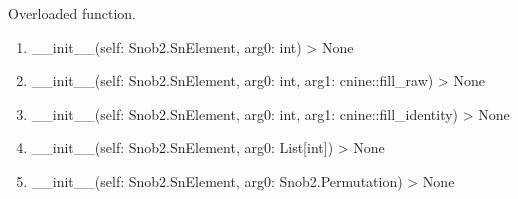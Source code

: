 \documentclass[letterpaper,10pt,english]{sphinxmanual}
\begin{document}
\begin{fulllineitems}

\begin{fulllineitems}
\label{\detokenize{index:Snob2.SnElement.__init__}}
\sphinxAtStartPar
Overloaded function.
\begin{enumerate}
%
\item {} 
\sphinxAtStartPar
\_\_init\_\_(self: Snob2.SnElement, arg0: int) \sphinxhyphen{}\textgreater{} None

\item {} 
\sphinxAtStartPar
\_\_init\_\_(self: Snob2.SnElement, arg0: int, arg1: cnine::fill\_raw) \sphinxhyphen{}\textgreater{} None

\item {} 
\sphinxAtStartPar
\_\_init\_\_(self: Snob2.SnElement, arg0: int, arg1: cnine::fill\_identity) \sphinxhyphen{}\textgreater{} None

\item {} 
\sphinxAtStartPar
\_\_init\_\_(self: Snob2.SnElement, arg0: List{[}int{]}) \sphinxhyphen{}\textgreater{} None

\item {} 
\sphinxAtStartPar
\_\_init\_\_(self: Snob2.SnElement, arg0: Snob2.Permutation) \sphinxhyphen{}\textgreater{} None

\end{enumerate}

\end{fulllineitems}


\begin{fulllineitems}
\label{\detokenize{index:Snob2.SnElement.__inv__}}
\end{fulllineitems}


\begin{fulllineitems}
\label{\detokenize{index:Snob2.SnElement.__mul__}}
\end{fulllineitems}


\end{fulllineitems}
\end{document}
